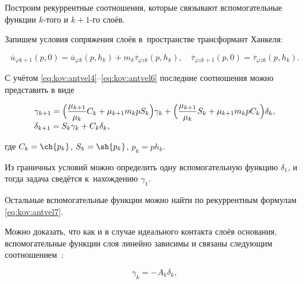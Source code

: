 Построим рекуррентные соотношения, которые связывают вспомогательные функции $k$-того и $k+1$-го слоёв. 

Запишем условия сопряжения слоёв в~пространстве трансформант Ханкеля:

\begin{equation*}

\overline{u}_{\varphi k+1}(p, 0)=\overline{u}_{\varphi k}(p, h_{k})+m_{k}\overline{\tau}_{\varphi zk}(p, h_{k}), \quad 

\overline{\tau}_{\varphi z k+1}(p, 0)=\overline{\tau}_{\varphi z k}(p,h_{k}).

\end{equation*}

С учётом \eqref{eq:kov:antvel4}--\eqref{eq:kov:antvel6} последние соотношения можно представить в виде

\begin{equation}

\begin{array}{l}

\displaystyle

\gamma_{k+1}=\Bigl(\frac{\mu_{k+1}}{\mu_{k}}C_{k}+\mu_{k+1}m_{k}p S_{k}\Bigr)\gamma_{k}+

\Bigl(\frac{\mu_{k+1}}{\mu_{k}}S_{k}+\mu_{k+1}m_{k}p C_{k}\Bigr)\delta_{k}, \\[2mm]

\delta_{k+1}=S_{k}\gamma_{k}+C_{k}\delta_{k},

\end{array}

\label{eq:kov:antvel7}

\end{equation}

где  $C_{k}=\ch{p_{k}}$, $S_{k}=\sh{p_{k}}$, $p_{k}=ph_{k}$.



Из граничных условий можно определить одну вспомогательную функцию $\delta_{1}$, и тогда задача сведётся к~нахождению $\gamma_{1}$. 

Остальные вспомогательные функции можно найти по рекуррентным формулам \eqref{eq:kov:antvel7}.



Можно доказать, что как и в случае идеального контакта слоёв основания, вспомогательные функции слоя линейно зависимы и связаны следующим соотношением~\cite{antvel:bib:VelSteg-ru}:

\begin{equation}

\gamma_{k}=-A_{k}\delta_{k},\label{eq:kov:antvel8}

\end{equation}

